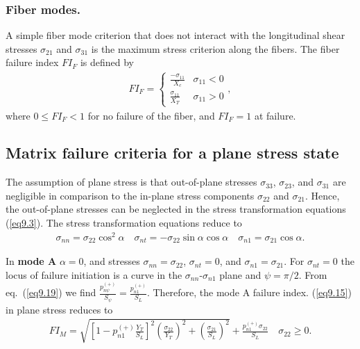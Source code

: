 \documentclass{AeroStructure-ERJohnson}
\begin{document}
\subsubsection{Fiber modes.} A simple fiber mode criterion that does not interact with the longitudinal shear stresses $\sigma_{21}$ and $\sigma_{31}$ is the maximum stress criterion along the fibers. The fiber failure index $F I_{F}$ is defined by
\begin{align}\label{eq9.35}
F I_{F}= \begin{cases}\frac{-\sigma_{11}}{X_{c}} & \sigma_{11}<0 \\[5pt]
\frac{\sigma_{11}}{X_{T}} & \sigma_{11}>0\end{cases},
\end{align}
where $0 \leq F I_{F}<1$ for no failure of the fiber, and $F I_{F}=1$ at failure.

\subsection{Matrix failure criteria for a plane stress state}\label{sec9.1.2}

The assumption of plane stress is that out-of-plane stresses $\sigma_{33}$, $\sigma_{23}$, and $\sigma_{31}$ are negligible in comparison to the in-plane stress components $\sigma_{22}$ and $\sigma_{21}$. Hence, the out-of-plane stresses can be neglected in the stress transformation equations (\ref{eq9.3}). The stress transformation equations reduce to
\begin{align}\label{eq9.36}
\sigma_{nn}=\sigma_{22} \cos ^{2}\alpha \quad \sigma_{n t}=-\sigma_{22} \sin \alpha \cos \alpha \quad \sigma_{n 1}=\sigma_{21} \cos \alpha.
\end{align}

In \textbf{mode A} $\alpha= 0$, and stresses $\sigma_{\textit{nn}} = \sigma_{22}$, $\sigma_{\textit{nt}} = 0$, and $\sigma_{{n1}} = \sigma_{21}$. For $\sigma_{\textit{nt}} = 0$ the locus of failure initiation is a curve in the $\sigma_{\textit{nn}}$-$\sigma_{{n1}}$ plane and $\psi=\pi/2$. From eq.~(\ref{eq9.19}) we find $\frac{p_{n\psi}^{(+)}}{S_{\psi}}=\frac{p_{n 1}^{(+)}}{S_{L}}$. Therefore, the mode A failure index. (\ref{eq9.15}) in plane stress reduces to
\begin{align}\label{eq9.37}
F I_{M}=\sqrt{\left[1-p_{n 1}^{(+)} \frac{Y_{T}}{S_{L}}\right]^{2}\left(\frac{\sigma_{22}}{Y_{T}}\right)^{2}+\left(\frac{\sigma_{21}}{S_{L}}\right)^{2}}+\frac{p_{n 1}^{(+)} \sigma_{22}}{S_{L}} \quad \sigma_{22} \geq 0.
\end{align}
\end{document}
